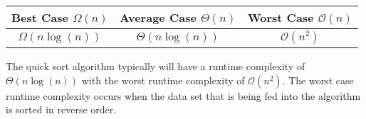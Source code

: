 \begin{highlight}
\begin{center}
    \begin{tabular}{|c|c|c|}
        \hline \textbf{Best Case $\Omega(n)$} & \textbf{Average Case $\Theta(n)$} & \textbf{Worst Case $\mathcal{O}(n)$} \\ \hline
        $\Omega(n\log{(n)})$ & $\Theta(n\log{(n)})$ & $\mathcal{O}(n^2)$ \\ \hline
    \end{tabular}
\end{center}

\noindent The quick sort algorithm typically will have a runtime complexity of $\Theta(n\log{(n)})$ with the worst runtime complexity of $\mathcal{O}(n^2)$. The worst case runtime complexity occurs when the data set that is being fed into the algorithm is sorted in reverse order.
\end{highlight}

\clearpage